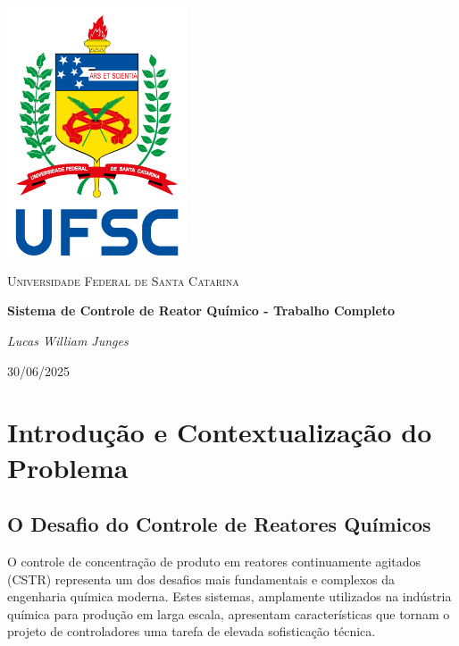 \documentclass[a4paper,12pt]{article}
\newcommand{\reporttitle}{Sistema de Controle de Reator Químico - Trabalho Completo}
\newcommand{\reportauthor}{
Lucas William Junges}
\newcommand{\reportdate}{30/06/2025}
\begin{document}
\begin{titlepage}
    \centering
    \vspace*{1cm}
    \includegraphics[width=0.4\textwidth]{Imagens/BrasaoUFSC.png} %
    \par\vspace{1cm}
    {\scshape\Large Universidade Federal de Santa Catarina\par} %
    \vspace{1.2cm}
    {\huge\bfseries \reporttitle\par}
    \vspace{2cm}
    {\Large\itshape \reportauthor\par}
    \vfill
    {\large \reportdate\par}
\end{titlepage}





\section{Introdução e Contextualização do Problema}

\subsection{O Desafio do Controle de Reatores Químicos}

O controle de concentração de produto em reatores continuamente agitados (CSTR) representa um dos desafios mais fundamentais e complexos da engenharia química moderna. Estes sistemas, amplamente utilizados na indústria química para produção em larga escala, apresentam características que tornam o projeto de controladores uma tarefa de elevada sofisticação técnica.
\end{document}
